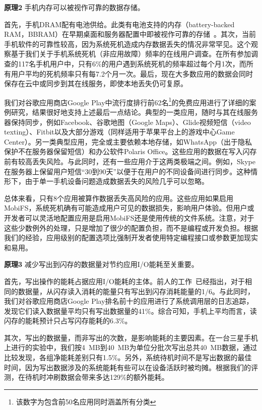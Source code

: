 \textbf{原理2} 手机内存可以被视作可靠的数据存储。

首先，手机DRAM配有电池供给。此类有电池支持的内存（battery-backed RAM，BBRAM）在早期桌面和服务器配置中即被视作可靠的存储~\cite{DeWitt:1984:ITM:602259.602261, Wang:2002:CBP:647057.713872, Wu:1994:ENM:195473.195506}。其次，当前手机软件的可靠性较高，因为系统死机造成内存数据丢失的情况非常罕见。这个观察基于我们关于手机系统死机（非应用故障）频率的在线用户调查。在所有参加调查的117名手机用户中，只有6\%的用户遇到系统死机的频率超过每个月1次，而所有用户平均的死机频率只有每7.2个月一次。最后，现在大多数应用的数据会同时保存在云中或同步到其在线服务，即使本地丢失仍可复原。

我们对谷歌应用商店Google Play中流行度排行前62名\footnote{该数字为包含前50名应用同时涵盖所有分类}的免费应用进行了详细的案例研究，结果很好地支持上述最后一点结论。典型的一类应用，随时与其在线服务器保持同步，例如Facebook、谷歌地图（Google Maps）、Glide视频短信（video texting）、Fitbit以及大部分游戏（同样适用于苹果平台上的游戏中心Game Center）。另一类典型应用，完全或主要依赖本地存储，如WhatsApp（出于隐私保护不在服务器保留短信）和办公软件Polaris Office。这些应用的数据在写入闪存前有较高丢失风险。与此同时，还有一些应用介于这两类极端之间。例如，Skype在服务器上保留用户短信“30到90天”以便于在用户的不同设备间进行同步。这种情形下，由于单一手机设备问题造成数据丢失的风险几乎可以忽略。

总体来看，只有8个应用被算作数据丢失高风险的应用。这些应用如果启用MobiFS，系统死机确有可能造成用户可见的数据损失，影响用户体验。但用户或开发者可以灵活地配置应用是启用MobiFS还是使用传统的文件系统。注意，对于这些少数例外的处理，只是增加了很少的配置负担，而不是编程或开发负担。根据我们的经验，应用级别的配置选项比强制开发者使用特定编程接口或参数更加现实和易用。

\textbf{原理3} 减少写出到闪存的数据量对节约应用I/O能耗至关重要。

首先，写出操作的能耗占据应用I/O能耗的主体。前人的工作~\cite{Carroll:2010:APC:1855840.1855861}已经指出，对于相同的数据量，从闪存读入消耗的能量只有写出到闪存消耗能量的1/6。与此同时，我们对谷歌应用商店Google Play排名前十的应用进行了系统调用层的日志追踪，发现它们读入数据量平均只有写出数据量的41\%。综合可知，手机上平均而言，读闪存的能耗预计只占写闪存能耗的6.3\%。

其次，写出的数据量，而非写出的次数，是影响能耗的主要因素。在一台三星手机上进行的实验中，我们按4~MB到40~MB为单位分批次写出总共40~MB数据，通过比较发现，各组净能耗差别只有1.5\%。另外，系统待机时间不是写出数据的最佳时间，因为写出数据涉及的系统能耗有些可以在设备活跃时被均摊。根据我们的评测，在待机时冲刷数据会带来多达129\%的额外能耗。

